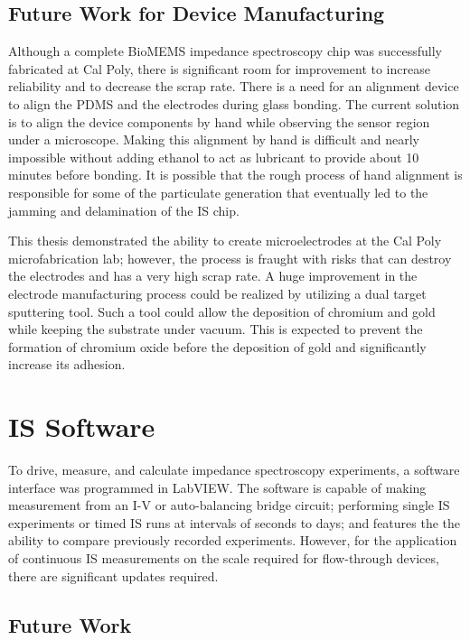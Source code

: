 \subsection*{Future Work for Device Manufacturing}

\par Although a complete BioMEMS impedance spectroscopy chip was successfully fabricated at Cal Poly, there is significant room for improvement to increase reliability and to decrease the scrap rate. There is a need for an alignment device to align the PDMS and the electrodes during glass bonding. The current solution is to align the device components by hand while observing the sensor region under a microscope. Making this alignment by hand is difficult and nearly impossible without adding ethanol to act as lubricant to provide about 10 minutes before bonding. It is possible that the rough process of hand alignment is responsible for some of the particulate generation that eventually led to the jamming and delamination of the IS chip. 

\par This thesis demonstrated the ability to create microelectrodes at the Cal Poly microfabrication lab; however, the process is fraught with risks that can destroy the electrodes and has a very high scrap rate. A huge improvement in the electrode manufacturing process could be realized by utilizing a dual target sputtering tool. Such a tool could allow the deposition of chromium and gold while keeping the substrate under vacuum. This is expected to prevent the formation of chromium oxide before the deposition of gold and significantly increase its adhesion.  


\section{IS Software}
\par To drive, measure, and calculate impedance spectroscopy experiments, a software interface was programmed in LabVIEW. The software is capable of making measurement from an I-V or auto-balancing bridge circuit; performing single IS experiments or timed IS runs at intervals of seconds to days; and features the the ability to compare previously recorded experiments. However, for the application of continuous IS measurements on the scale required for flow-through devices, there are significant updates required. 

\subsection*{Future Work}

